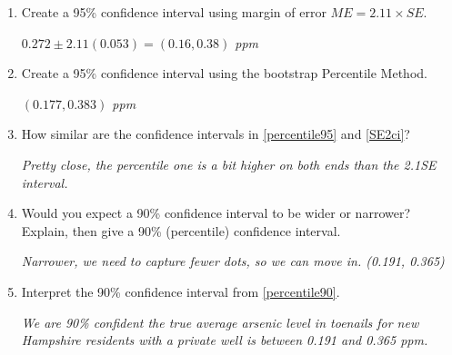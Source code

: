 \begin{enumerate}
\item \label{SE2ci} Create a 95\% confidence interval using margin of
  error $ME =  2.11  \times SE$.
\begin{students}
  \vspace{1cm}
\end{students}

\begin{key}
  {\it $ 0.272 \pm 2.11(0.053) = (0.16, 0.38)$ ppm}
\end{key}

\item  \label{percentile95} Create a 95\% confidence interval using
  the bootstrap   Percentile Method.
\begin{students}
  \vspace{1cm}
\end{students}

\begin{key}
  {\it $ (0.177, 0.383)$ ppm}
\end{key}

\item  How similar are the confidence intervals in \ref{percentile95}
  and \ref{SE2ci}?
\begin{students}
  \vspace{1cm}
\end{students}

\begin{key}
  {\it Pretty close, the percentile one is a bit higher on both ends
    than the 2.1SE interval.}
\end{key}


\item \label{percentile90}Would you expect a 90\% confidence interval
  to be wider or narrower?  Explain, then give a 90\% (percentile)
  confidence interval.
\begin{students}
  \vspace{2cm}
\end{students}

\begin{key}
  {\it Narrower, we need to capture fewer dots, so we can move in.
    (0.191, 0.365)} 
\end{key}

\item  Interpret the 90\% confidence interval from \ref{percentile90}.
\begin{students}
  \vspace{2cm}
\end{students}

\begin{key}
  {\it We are 90\% confident the true average arsenic level in
    toenails for new Hampshire residents  with a private well is
    between 0.191 and 0.365 ppm. }
\end{key}
\end{enumerate}


